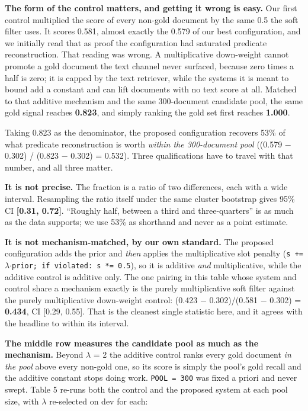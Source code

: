 \documentclass[runningheads]{llncs}
\begin{document}
\textbf{The form of the control matters, and getting it wrong is easy.} Our first control multiplied the score of every non-gold document by the same 0.5 the soft filter uses. It scores 0.581, almost exactly the 0.579 of our best configuration, and we initially read that as proof the configuration had saturated predicate reconstruction. That reading was wrong. A multiplicative down-weight cannot promote a gold document the text channel never surfaced, because zero times a half is zero; it is capped by the text retriever, while the systems it is meant to bound add a constant and can lift documents with no text score at all. Matched to that additive mechanism and the same 300-document candidate pool, the same gold signal reaches \textbf{0.823}, and simply ranking the gold set first reaches \textbf{1.000}.

Taking 0.823 as the denominator, the proposed configuration recovers 53\% of what predicate reconstruction is worth \textit{within the 300-document pool} ((0.579 $-$ 0.302) / (0.823 $-$ 0.302) = 0.532). Three qualifications have to travel with that number, and all three matter.

\textbf{It is not precise.} The fraction is a ratio of two differences, each with a wide interval. Resampling the ratio itself under the same cluster bootstrap gives 95\% CI \textbf{[0.31, 0.72]}. ``Roughly half, between a third and three-quarters'' is as much as the data supports; we use 53\% as shorthand and never as a point estimate.

\textbf{It is not mechanism-matched, by our own standard.} The proposed configuration adds the prior and \textit{then} applies the multiplicative slot penalty (\texttt{s += $\lambda$$\cdot$prior; if violated: s *= 0.5}), so it is additive \textit{and} multiplicative, while the additive control is additive only. The one pairing in this table whose system and control share a mechanism exactly is the purely multiplicative soft filter against the purely multiplicative down-weight control: (0.423 $-$ 0.302)/(0.581 $-$ 0.302) = \textbf{0.434}, CI [0.29, 0.55]. That is the cleanest single statistic here, and it agrees with the headline to within its interval.

\textbf{The middle row measures the candidate pool as much as the mechanism.} Beyond $\lambda$ = 2 the additive control ranks every gold document \textit{in the pool} above every non-gold one, so its score is simply the pool's gold recall and the additive constant stops doing work. \texttt{POOL = 300} was fixed a priori and never swept. Table 5 re-runs both the control and the proposed system at each pool size, with $\lambda$ re-selected on dev for each:
\end{document}
